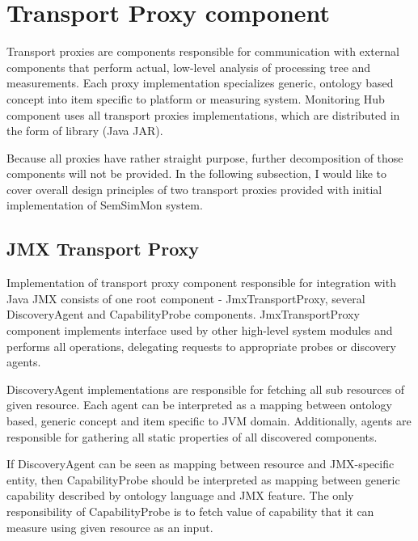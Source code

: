 %
\section{Transport Proxy component}
\label{sec:arch_tproxy}

Transport proxies are components responsible for communication with external components that perform actual, low-level analysis of processing tree and measurements. Each proxy implementation specializes generic, ontology based concept into item specific to platform or measuring system. Monitoring Hub component uses all transport proxies implementations, which are distributed in the form of library (Java JAR).

Because all proxies have rather straight purpose, further decomposition of those components will not be provided. In the following subsection, I would like to cover overall design principles of two transport proxies provided with initial implementation of SemSimMon system.

\subsection{JMX Transport Proxy}

Implementation of transport proxy component responsible for integration with Java JMX consists of one root component - JmxTransportProxy, several DiscoveryAgent and CapabilityProbe components. JmxTransportProxy component implements interface used by other high-level system modules and performs all operations, delegating requests to appropriate probes or discovery agents.

DiscoveryAgent implementations are responsible for fetching all sub resources of given resource. Each agent can be interpreted as a mapping between ontology based, generic concept and item specific to JVM domain. Additionally, agents are responsible for gathering all static properties of all discovered components.

If DiscoveryAgent can be seen as mapping between resource and JMX-specific entity, then CapabilityProbe should be interpreted as mapping between generic capability described by ontology language and JMX feature. The only responsibility of CapabilityProbe is to fetch value of capability that it can measure using given resource as an input.

